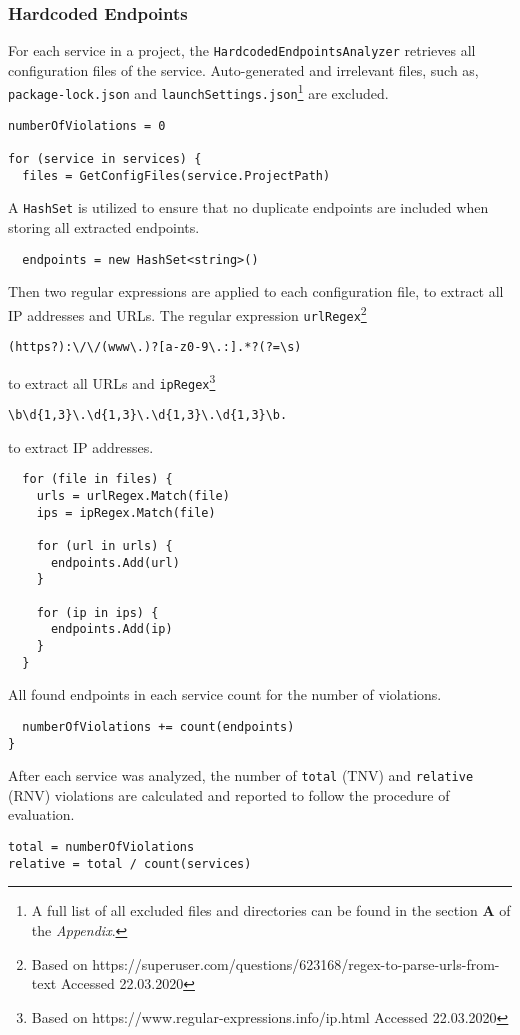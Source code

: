 \documentclass{article}
\begin{document}
\subsubsection{Hardcoded Endpoints}
For each service in a project, the \lstinline{HardcodedEndpointsAnalyzer} retrieves all configuration files of the service. Auto-generated and irrelevant files, such as, \lstinline{package-lock.json} and \lstinline{launchSettings.json}\footnote{A full list of all excluded files and directories can be found in the section \textbf{A} of the \textit{Appendix}.} are excluded.
\begin{lstlisting}
numberOfViolations = 0

for (service in services) {
  files = GetConfigFiles(service.ProjectPath)
\end{lstlisting}
A \lstinline{HashSet} is utilized to ensure that no duplicate endpoints are included when storing all extracted endpoints.
\begin{lstlisting}
  endpoints = new HashSet<string>()
\end{lstlisting}
Then two regular expressions are applied to each configuration file, to extract all IP addresses and URLs. The regular expression \lstinline{urlRegex}\footnote{Based on https://superuser.com/questions/623168/regex-to-parse-urls-from-text Accessed 22.03.2020} 
\begin{lstlisting}
(https?):\/\/(www\.)?[a-z0-9\.:].*?(?=\s)
\end{lstlisting}
\noindent to extract all URLs and \lstinline{ipRegex}\footnote{Based on https://www.regular-expressions.info/ip.html Accessed 22.03.2020} 
\begin{lstlisting}
\b\d{1,3}\.\d{1,3}\.\d{1,3}\.\d{1,3}\b.
\end{lstlisting}
to extract IP addresses.
\begin{lstlisting}
  for (file in files) {
    urls = urlRegex.Match(file)
    ips = ipRegex.Match(file)

    for (url in urls) {
      endpoints.Add(url)
    }

    for (ip in ips) {
      endpoints.Add(ip)
    }
  }
\end{lstlisting}
All found endpoints in each service count for the number of violations.
\begin{lstlisting}
  numberOfViolations += count(endpoints)
}
\end{lstlisting}
After each service was analyzed, the number of \lstinline{total} (TNV) and \lstinline{relative} (RNV) violations are calculated and reported to follow the procedure of evaluation.
\begin{lstlisting}
total = numberOfViolations
relative = total / count(services)
\end{lstlisting}
\end{document}
